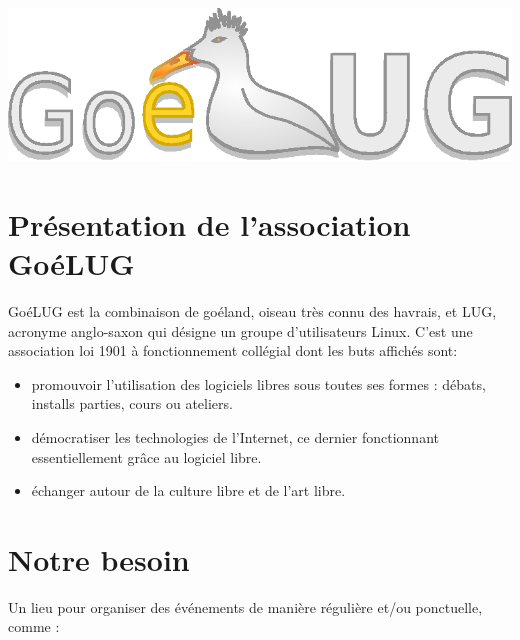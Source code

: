\documentclass[
bibliography=totoc,
headings=big,
captions=tableheading,
chapterprefix=true%
]{scrreprt}
\begin{document}

\hfill \includegraphics[scale=0.1]{goelug}

\section*{Présentation de l'association GoéLUG}


\minitoc

GoéLUG est la combinaison de goéland, oiseau très connu des havrais, et LUG, acronyme anglo-saxon qui désigne un groupe d’utilisateurs Linux. 
C'est une association loi 1901 à fonctionnement collégial dont les buts affichés sont:
    
\begin{itemize}
\item   promouvoir l'utilisation des logiciels libres sous toutes ses formes : débats, installs parties, cours ou ateliers.

 \item   démocratiser les technologies de l’Internet, ce dernier fonctionnant essentiellement grâce au logiciel libre.

\item    échanger autour de la culture libre et de l’art libre.

\end{itemize}


\section*{Notre besoin}

Un lieu pour organiser des événements de manière régulière et/ou ponctuelle, comme :
    
\end{document}
